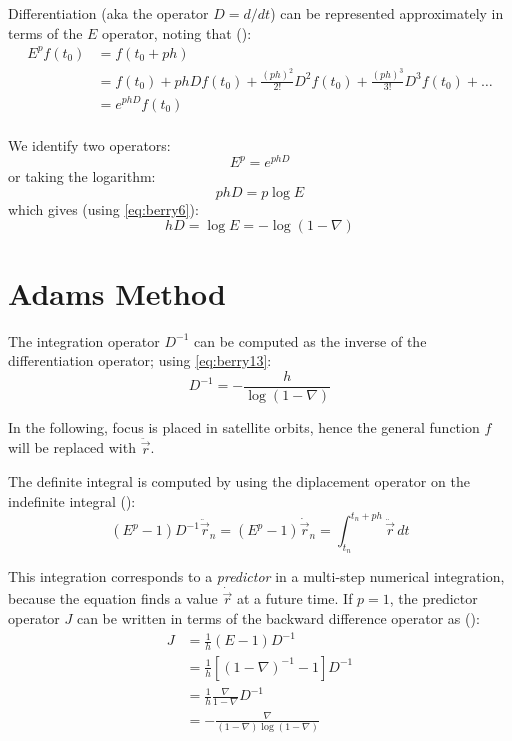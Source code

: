 Differentiation (aka the operator \( D = d / dt \)) can be represented approximately 
in terms of  the \( E \) operator, noting that (\cite{berry2004}):
\begin{equation}
  \begin{aligned}
  E^p f(t_0 ) & = f(t_0 + p h) \\
              & = f(t_0) + p h D f(t_0) + \frac{(ph)^2}{2!}D^2f(t_0) + 
      \frac{(ph)^3}{3!}D^3f(t_0) + \ldots \\
              & = e^{phD}f(t_0)\\
  \end{aligned}
\end{equation}

We identify two operators:
\begin{equation}
  E^p = e^{phD}
\end{equation}
or taking the logarithm:
\begin{equation}
  p h D = p \log E
\end{equation}
which gives (using \ref{eq:berry6}):
\begin{equation}
  \label{eq:berry13}
  h D = \log E = - \log(1-\nabla)
\end{equation}

\section{Adams Method}
The integration operator \( D^{-1} \) can be computed as the inverse of the 
differentiation operator; using \ref{eq:berry13}:
\begin{equation}
  D^{-1} = - \frac{h}{\log(1-\nabla)}
\end{equation}

In the following, focus is placed in satellite orbits, hence the general function 
\( f \) will be replaced with \( \ddot{\vec{r}} \).

The definite integral is computed by using the diplacement operator on the indefinite 
integral (\cite{berry2004}):
\begin{equation}
  (E^p -1) D^{-1} \ddot{\vec{r}}_n = (E^p -1) \dot{\vec{r}}_n 
  = \int_{t_n}^{t_n +ph} \ddot{\vec{r}} \,dt
\end{equation}

This integration corresponds to a \emph{predictor} in a multi-step numerical 
integration, because the equation finds a value \( \dot{\vec{r}} \) at a future 
time. If \( p = 1 \), the predictor operator \( J \) can be written in terms of 
the backward difference operator as (\cite{berry2004}):
\begin{equation}
  \begin{aligned}
  J & = \frac{1}{h} (E-1) D^{-1} \\
    & = \frac{1}{h} [ {(1-\nabla)}^{-1} - 1 ] D^{-1} \\
    & = \frac{1}{h} \frac{\nabla}{1-\nabla}D^{-1} \\
    & = - \frac{\nabla}{(1-\nabla) \log(1-\nabla)}
  \end{aligned}
\end{equation}

